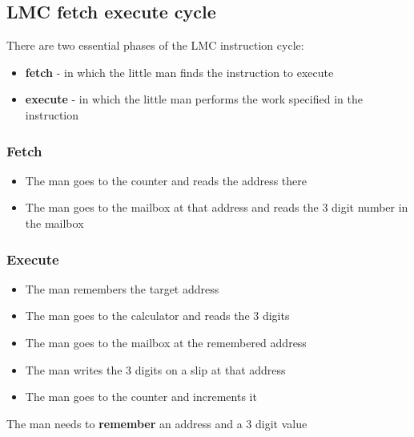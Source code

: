 \documentclass{article}[18pt]
\begin{document}
\subsection{LMC fetch execute cycle}
There are two essential phases of the LMC instruction cycle:
\begin{itemize}
\item \textbf{fetch} - in which the little man finds the instruction to execute
\item \textbf{execute} - in which the little man performs the work specified in the instruction
\end{itemize}
\subsubsection{Fetch}
\begin{itemize}
\item The man goes to the counter and reads the address there
\item The man goes to the mailbox at that address and reads the 3 digit number in the mailbox
\end{itemize}
\subsubsection{Execute}
\begin{itemize}
\item The man remembers the target address
\item The man goes to the calculator and reads the 3 digits
\item The man goes to the mailbox at the remembered address
\item The man writes the 3 digits on a slip at that address
\item The man goes to the counter and increments it
\end{itemize}
The man needs to \textbf{remember} an address and a 3 digit value
\end{document}

